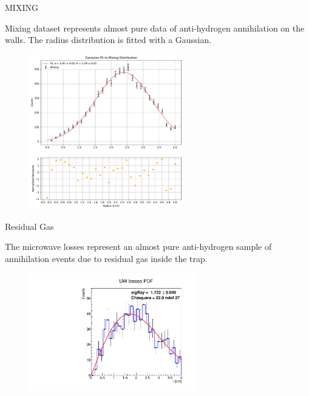 \documentclass[9pt]{beamer}
\begin{document}
\begin{frame}{MIXING}

Mixing dataset represents almost pure data of anti-hydrogen annihilation on the walls. The radius distribution is fitted with a Gaussian.

\begin{figure}
\vspace{-2pt}
\includegraphics[width = 0.6\textwidth]{./SingleModel/GaussianFitMixing.pdf}
\end{figure}

\end{frame}

\begin{frame}{Residual Gas}

The microwave losses represent an almost pure anti-hydrogen sample of annihilation events due to residual gas inside the trap.

\begin{figure}
\includegraphics[width = 0.65\textwidth]{./SingleModel/FitToUW.pdf}
\end{figure}

\end{frame}
\end{document}
